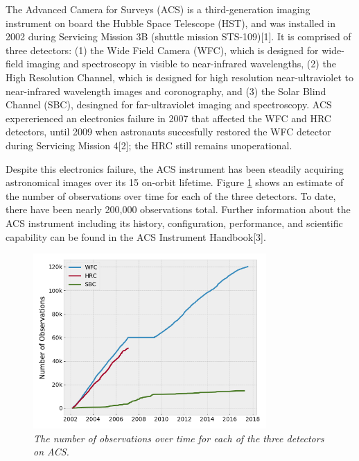 \documentclass[10pt,journal,compsoc]{IEEEtran}
\begin{document}
The Advanced Camera for Surveys (ACS) is a third-generation imaging instrument on board the Hubble Space Telescope (HST), and was
installed in 2002 during Servicing Mission 3B (shuttle mission STS-109)[1]. It is comprised of three detectors: (1) the Wide Field Camera
(WFC), which is designed for wide-field imaging and spectroscopy in visible to near-infrared wavelengths, (2) the High Resolution Channel,
which is designed for high resolution near-ultraviolet to near-infrared wavelength images and coronography, and (3) the Solar Blind
Channel (SBC), desingned for far-ultraviolet imaging and spectroscopy.  ACS expererienced an electronics failure in 2007 that affected
the WFC and HRC detectors, until 2009 when astronauts succesfully restored the WFC detector during Servicing Mission 4[2]; the HRC still
remains unoperational.

Despite this electronics failure, the ACS instrument has been steadily acquiring astronomical images over its 15 on-orbit lifetime.
Figure \ref{fig1} shows an estimate of the number of observations over time for each of the three detectors.  To date, there have been
nearly 200,000 observations total.  Further information about the ACS instrument including its history, configuration, performance, and
scientific capability can be found in the ACS Instrument Handbook[3].

\begin{figure}[!t]
\centering
\includegraphics[width=3.5in]{./figures/num_obs.png}
\caption{\textit{The number of observations over time for each of the three detectors on ACS.}}
\label{fig1}
\end{figure}
\end{document}
